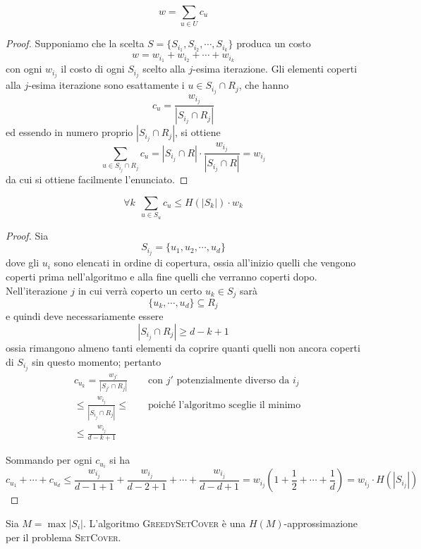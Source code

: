 \begin{lemma}\label{lem:gsetcov_w_sum_c_u}
	$$
		w = \sum_{u \in U} c_u
	$$
\end{lemma}
\begin{proof}
	Supponiamo che la scelta $S = \{S_{i_1}, S_{i_2}, \cdots, S_{i_k}\}$ produca
	un costo
	$$
		w = w_{i_1} + w_{i_2} + \cdots + w_{i_k}
	$$
	con ogni $w_{i_j}$ il costo di ogni $S_{i_j}$ scelto alla $j$-esima iterazione.
	Gli elementi coperti alla $j$-esima iterazione sono esattamente i
	$u \in S_{i_j} \cap R_j$, che hanno
	$$
		c_u = \frac{w_{i_j}}{|S_{i_j} \cap R_j|}
	$$
	ed essendo in numero proprio $|S_{i_j} \cap R_j|$, si ottiene
	$$
		\sum_{u \in S_{i_j} \cap R_j} c_u = |S_{i_j} \cap R| \cdot \frac{w_{i_j}}{|S_{i_j} \cap R|} = w_{i_j}
	$$
	da cui si ottiene facilmente l'enunciato.
\end{proof}
\begin{lemma}\label{lem:gsetcov_cu_leq_harmoskwk}
	$$
		\forall k ~~ \sum_{u \in S_u} c_u \leq H(|S_k|) \cdot w_k
	$$
\end{lemma}
\begin{proof}
	Sia
	$$
		S_{i_j} = \{u_1, u_2, \cdots, u_d\}
	$$
	dove gli $u_i$ sono elencati in ordine di copertura, ossia all'inizio
	quelli che vengono coperti prima nell'algoritmo e alla fine quelli
	che verranno coperti dopo.
	Nell'iterazione $j$ in cui verrà coperto un certo $u_k \in S_j$ sarà
	$$
		\{u_k, \cdots, u_d\} \subseteq R_j
	$$
	e quindi deve necessariamente essere
	$$
		|S_{i_j} \cap R_j| \geq d - k + 1
	$$
	ossia rimangono almeno tanti elementi da coprire quanti quelli non ancora
	coperti di $S_{i_j}$ sin questo momento; pertanto
	\begin{align*}
		 & c_{u_k} = \frac{w_{j'}}{|S_{j'} \cap R_j|}   &  & \text{ con } j' \text{ potenzialmente diverso da } i_j \\
		 & \leq \frac{w_{i_j}}{|S_{i_j} \cap R_j|} \leq &  & \text{ poiché l'algoritmo sceglie il minimo}           \\
		 & \leq \frac{w_{i_j}}{d-k+1}
	\end{align*}

	Sommando per ogni $c_{u_i}$ si ha
	$$
		c_{u_1} + \cdots + c_{u_d} \leq \frac{w_{i_j}}{d-1 + 1} + \frac{w_{i_j}}{d-2+1} + \cdots + \frac{w_{i_j}}{d-d+1}
		= w_{i_j}(1 + \frac{1}{2} + \cdots + \frac{1}{d})
		= w_{i_j} \cdot H(|S_{i_j}|)
	$$
\end{proof}
\begin{theorem}
	Sia $M = \max{|S_i|}$. L'algoritmo \textsc{GreedySetCover} è una $H(M)$-approssimazione per
	il problema \textsc{SetCover}.
\end{theorem}
